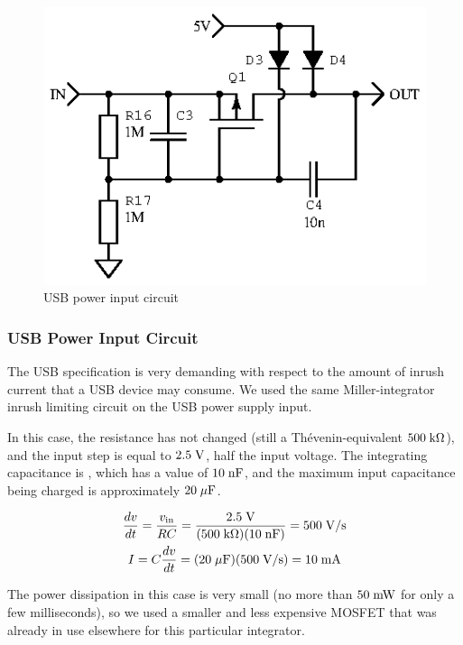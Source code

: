 \begin{figure}[H]
\centering
\includegraphics[]{usbinput}
\caption{USB power input circuit}
\label{fig:usbpower}
\end{figure}

\subsubsection{USB Power Input Circuit}


The USB specification is very demanding with respect to the amount of inrush
current that a USB device may consume. We used the same Miller-integrator
inrush limiting circuit on the USB power supply input.

In this case, the resistance has not changed (still a Th\'evenin-equivalent
$500\;\mathrm{k\Omega}$), and the input step is equal to $2.5\;\mathrm{V}$, half the
input voltage. The integrating capacitance is , which has a value of $10\;\mathrm{nF}$,
and the maximum input capacitance being charged is approximately $20\;\mathrm{\mu F}$.

\begin{gather*}
    \frac{dv}{dt} = \frac{v_{\mathrm{in}}}{RC} = \frac{2.5\;\mathrm{V}}{(500\;\mathrm{k\Omega})(10\;\mathrm{nF})}
    = 500\;\mathrm{V/s} \\
    I = C \frac{dv}{dt} = (20\;\mathrm{\mu F})(500\;\mathrm{V/s}) = 10\;\mathrm{mA}
\end{gather*}

The power dissipation in this case is very small (no more than $50\;\mathrm{mW}$ for
only a few milliseconds), so we used a smaller and less expensive MOSFET that
was already in use elsewhere for this particular integrator.

